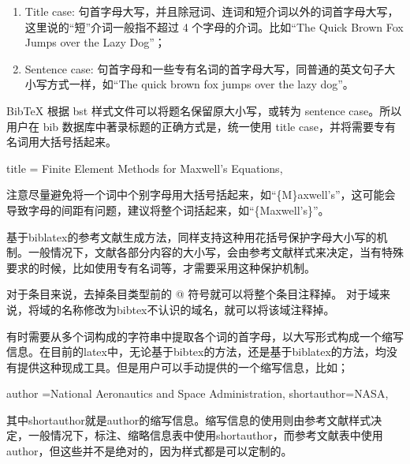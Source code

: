 \begin{enumerate}
\def\labelenumi{\arabic{enumi}.}

\item
  Title case:
  句首字母大写，并且除冠词、连词和短介词以外的词首字母大写，这里说的``短''介词一般指不超过
  4 个字母的介词。比如``The Quick Brown Fox Jumps over the Lazy Dog''；
\item
  Sentence case:
  句首字母和一些专有名词的首字母大写，同普通的英文句子大小写方式一样，如``The
  quick brown fox jumps over the lazy dog''。
\end{enumerate}

BibTeX 根据 bst 样式文件可以将题名保留原大小写，或转为 sentence
case。所以用户在 bib 数据库中著录标题的正确方式是，统一使用 title
case，并将需要专有名词用大括号括起来。

\begin{texlist}
title = {Finite Element Methods for {Maxwell's} Equations},
\end{texlist}

注意尽量避免将一个词中个别字母用大括号括起来，如``\{M\}axwell's''，这可能会导致字母的间距有问题，建议将整个词括起来，如``\{Maxwell's\}''。

基于biblatex的参考文献生成方法，同样支持这种用花括号保护字母大小写的机制。一般情况下，文献各部分内容的大小写，会由参考文献样式来决定，当有特殊要求的时候，比如使用专有名词等，才需要采用这种保护机制。




对于条目来说，去掉条目类型前的 @ 符号就可以将整个条目注释掉。
对于域来说，将域的名称修改为bibtex不认识的域名，就可以将该域注释掉。




有时需要从多个词构成的字符串中提取各个词的首字母，以大写形式构成一个缩写信息。在目前的latex中，无论基于bibtex的方法，还是基于biblatex的方法，均没有提供这种现成工具。但是用户可以手动提供的一个缩写信息，比如；

\begin{texlist}
author ={{National Aeronautics and Space Administration}},
shortauthor={NASA},
\end{texlist}

其中shortauthor就是author的缩写信息。缩写信息的使用则由参考文献样式决定，一般情况下，标注、缩略信息表中使用shortauthor，而参考文献表中使用author，但这些并不是绝对的，因为样式都是可以定制的。



